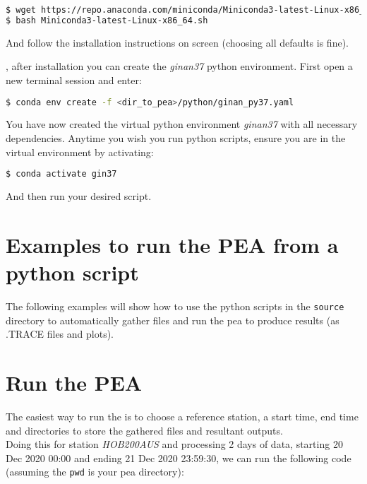 \begin{lstlisting}[language=bash,caption=Installing conda]
$ wget https://repo.anaconda.com/miniconda/Miniconda3-latest-Linux-x86_64.sh
$ bash Miniconda3-latest-Linux-x86_64.sh
\end{lstlisting}

And follow the installation instructions on screen (choosing all
defaults is fine).

, after installation you can create the \emph{ginan37} python environment. First open a new terminal session and enter:

\begin{lstlisting}[language=bash,caption=Example showing how to create a conda environment]
$ conda env create -f <dir_to_pea>/python/ginan_py37.yaml
\end{lstlisting}

You have now created the virtual python environment \emph{ginan37}
with all necessary dependencies. Anytime you wish you run python
scripts, ensure you are in the virtual environment by activating:

\begin{lstlisting}[language=bash,caption=Activating a conda environment]
$ conda activate gin37
\end{lstlisting}

And then run your desired script.

\section{Examples to run the PEA from a python script}\label{examples-to-run-the-pea-from-a-python-script}

The following examples will show how to use the python scripts in the
\texttt{source} directory to automatically gather files and run the pea
to produce results (as .TRACE files and plots).

\section{Run the PEA}\label{run-the-pea}

The easiest way to run the is to choose a reference station, a start
time, end time and directories to store the gathered files and resultant
outputs.\\
Doing this for station \emph{HOB200AUS} and processing 2 days of data,
starting 20 Dec 2020 00:00 and ending 21 Dec 2020 23:59:30, we can run
the following code (assuming the \texttt{pwd} is your pea directory):


